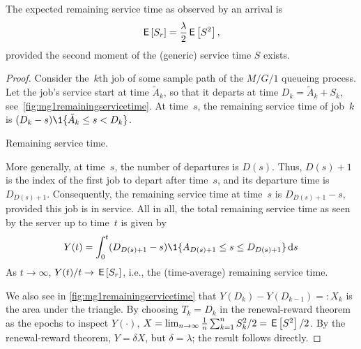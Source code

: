 \documentclass[stochastic-or.tex]{subfiles}
\begin{document}
\begin{theorem}
The expected remaining service time as observed by an arrival is
\begin{equation*}
\,\mathsf{E}\left[S_r\right] = \frac{\lambda}2 \,\mathsf{E}\left[S^2\right],
\end{equation*}
provided the second moment of the (generic) service time $S$ exists.
\end{theorem}
\begin{proof}
Consider the~$k$th job of some sample path of the $M/G/1$ queueing process.
Let the job's service start at time $\tilde A_k$, so that it departs at time $D_k=\tilde A_k + S_k$, see~\cref{fig:mg1remainingservicetime}.
At time~$s$,  the remaining service time of job~$k$ is
$(D_k-s)\1{\tilde A_k \leq s < D_k}$.
\begin{marginfigure}
 \caption{Remaining service time.}
 \label{fig:mg1remainingservicetime}
\end{marginfigure}
More generally, at time~$s$, the number of departures is $D(s)$.
Thus, $D(s)+1$ is the index of the first job to depart after time~$s$, and its departure time is $D_{D(s)+1}$.
Consequently, the remaining service time at time~$s$ is $D_{D(s)+1}-s$, provided this job is in service.
All in all, the total remaining service time as seen by the server up to time~$t$ is given by
 \begin{equation*}
 Y(t) = \int_0^t (D_{D(s)+1}-s)\1{A_{D(s)+1} \leq s \leq D_{D(s)+1}} \d s
 \end{equation*}
As $t \to \infty$, $Y(t)/t \to \,\mathsf{E}\left[S_{r}\right]$, i.e., the  (time-average) remaining service time.

 We also see in \cref{fig:mg1remainingservicetime} that $Y(D_k) - Y(D_{k-1}) =:X_k$ is the area under the triangle.
 By choosing $T_k=D_k$ in the renewal-reward theorem as the epochs to inspect $Y(\cdot)$, $X=\lim_{n\to\infty} \frac{1}{n}\sum_{k=1}^n S_k^2/ 2 = \,\mathsf{E}\left[S^2\right]/2$.
 By the renewal-reward theorem, $Y=\delta X$, but $\delta = \lambda$;  the result follows directly.
\end{proof}
\end{document}
